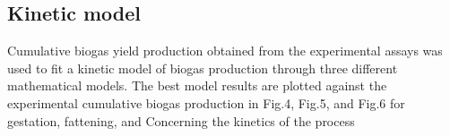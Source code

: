 \subsection{Kinetic model}
Cumulative biogas yield production obtained from the experimental assays was used to fit a kinetic model of biogas production through three different mathematical models. The best model results are plotted against the experimental cumulative biogas production in Fig.4, Fig.5, and Fig.6 for gestation, fattening, and
Concerning the kinetics of the process